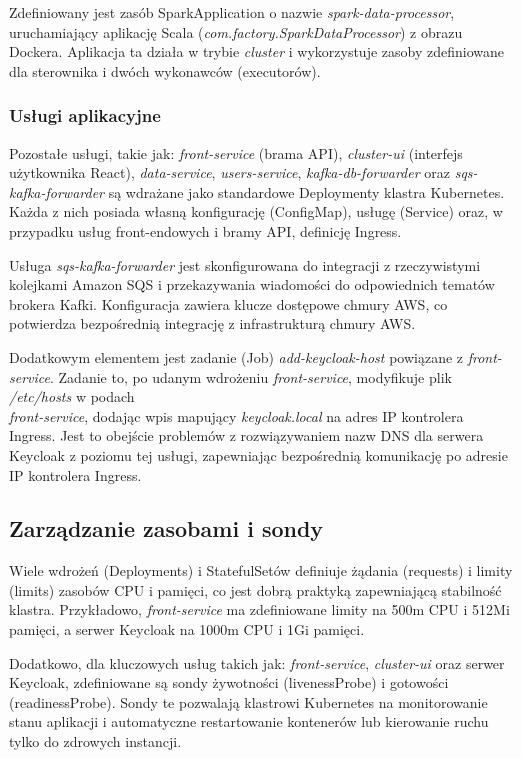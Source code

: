 Zdefiniowany jest zasób SparkApplication o nazwie \textit{spark-data-processor}, uruchamiający aplikację Scala (\textit{com.factory.SparkDataProcessor}) z obrazu Dockera. Aplikacja ta działa w trybie \textit{cluster} i wykorzystuje zasoby zdefiniowane dla sterownika i dwóch wykonawców (executorów).

\subsubsection{Usługi aplikacyjne}
Pozostałe usługi, takie jak: \textit{front-service} (brama API), \textit{cluster-ui} (interfejs użytkownika React), \textit{data-service}, \textit{users-service}, \textit{kafka-db-forwarder} oraz \textit{sqs-kafka-forwarder} są wdrażane jako standardowe Deploymenty klastra Kubernetes. Każda z nich posiada własną konfigurację (ConfigMap), usługę (Service) oraz, w przypadku usług front-endowych i bramy API, definicję Ingress.

Usługa \textit{sqs-kafka-forwarder} jest skonfigurowana do integracji z rzeczywistymi kolejkami Amazon SQS i przekazywania wiadomości do odpowiednich tematów brokera Kafki. Konfiguracja zawiera klucze dostępowe chmury AWS, co potwierdza bezpośrednią integrację z infrastrukturą chmury AWS.

Dodatkowym elementem jest zadanie (Job) \textit{add-keycloak-host} powiązane z \textit{front-service}. Zadanie to, po udanym wdrożeniu \textit{front-service}, modyfikuje plik \textit{/etc/hosts} w podach \\ \textit{front-service}, dodając wpis mapujący \textit{keycloak.local} na adres IP kontrolera Ingress. Jest to obejście problemów z rozwiązywaniem nazw DNS dla serwera Keycloak z poziomu tej usługi, zapewniając bezpośrednią komunikację po adresie IP kontrolera Ingress.

\subsection{Zarządzanie zasobami i sondy}
\label{sub:zasoby_sondy}
Wiele wdrożeń (Deployments) i StatefulSetów definiuje żądania (requests) i limity (limits) zasobów CPU i pamięci, co jest dobrą praktyką zapewniającą stabilność klastra. Przykładowo, \textit{front-service} ma zdefiniowane limity na 500m CPU i 512Mi pamięci, a serwer Keycloak na 1000m CPU i 1Gi pamięci.

Dodatkowo, dla kluczowych usług takich jak: \textit{front-service}, \textit{cluster-ui} oraz serwer Keycloak, zdefiniowane są sondy żywotności (livenessProbe) i gotowości (readinessProbe). Sondy te pozwalają klastrowi Kubernetes na monitorowanie stanu aplikacji i automatyczne restartowanie kontenerów lub kierowanie ruchu tylko do zdrowych instancji.
